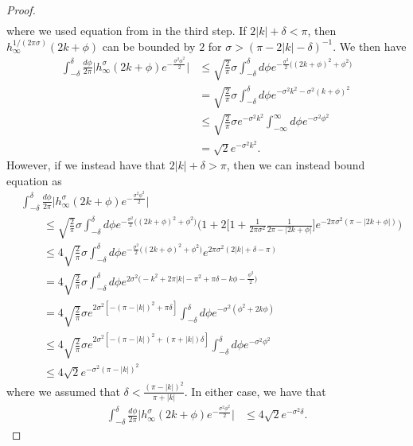 \documentclass[../thesis-main/thesis-main]{subfiles}
\begin{document}
\begin{proof}
\begin{align}
\end{align}
where we used equation  from  in the third step.  If $2|k|+ \delta < \pi$, then $h_{\infty}^{1/(2\pi\sigma)} (2k+\phi)$ can be bounded by $2$ for $\sigma > (\pi - 2|k| - \delta)^{-1}$.  We then have
\begin{align}
 \int_{-\delta}^\delta \frac{d\phi}{2\pi} \Big| h_\infty^\sigma(2 k+\phi) e^{-\frac{\sigma^2\phi^2}{2}}\Big|&\leq \sqrt{\frac{2}{\pi}} \sigma \int_{-\delta}^\delta d\phi e^{- \frac{\sigma^2}{2} \big( (2k + \phi)^2 + \phi^2\big)}\\
  & = \sqrt{\frac{2}{\pi}} \sigma \int_{-\delta}^{\delta} d\phi e^{ -\sigma^2 k^2 - \sigma^2 (k + \phi)^2}\\
  & \leq \sqrt{\frac{2}{\pi}} \sigma e^{-\sigma^2 k^2} \int_{-\infty}^\infty d\phi e^{ -\sigma^2 \phi^2}\\
  & = \sqrt{2} e^{-\sigma^2 k^2}.
\end{align}
However, if we instead have that  $2|k| + \delta > \pi$, then we can instead bound equation   as
\begin{align}
&\int_{-\delta}^\delta \frac{d\phi}{2\pi} \Big| h_\infty^\sigma(2 k+\phi) e^{-\frac{\sigma^2\phi^2}{2}}\Big|\nonumber\\
  & \qquad \leq \sqrt{\frac{2}{\pi}} \sigma \int_{-\delta}^{\delta}d\phi e^{ -\frac{\sigma^2}{2} \big( (2k+ \phi)^2 + \phi^2\big)}\Bigg( 1 + 2 \Bigg[ 1 + \frac{1}{2\pi \sigma^2} \frac{1}{ 2\pi - |2k + \phi|}\Bigg] e^{- 2\pi \sigma^2 (\pi - |2k + \phi|)}\Bigg)\\
  &\qquad \leq 4 \sqrt{\frac{2}{\pi}}\sigma \int_{-\delta}^{\delta} d\phi e^{ -\frac{\sigma^2}{2} \big( (2k+ \phi)^2 + \phi^2\big)} e^{2 \pi \sigma^2 (2 |k| + \delta - \pi)}\\
  &\qquad =4 \sqrt{\frac{2}{\pi}}\sigma \int_{-\delta}^{\delta} d\phi  e^{  2\sigma^2 \big(-k^2 +2\pi |k| -\pi^2 + \pi \delta - k\phi - \frac{\phi^2}{2} \big)}\\
  &\qquad =4 \sqrt{\frac{2}{\pi}}\sigma e^{2\sigma^2[-(\pi - |k|)^2 + \pi \delta]}\int_{-\delta}^{\delta} d\phi e^{  -\sigma^2 (\phi^2 + 2k\phi )}\\
  &\qquad \leq 4 \sqrt{\frac{2}{\pi}}\sigma e^{2\sigma^2[-(\pi - |k|)^2 + (\pi + |k|) \delta]} \int_{-\delta}^{\delta} d\phi e^{- \sigma^2 \phi^2}\\
  & \qquad \leq 4\sqrt{2} e^{ -\sigma^2 (\pi - |k|)^2}
  \end{align}
where we assumed that $\delta < \frac{(\pi-|k|)^2}{\pi + |k|}$.  In either case, we have that 
\begin{align}
\int_{-\delta}^\delta \frac{d\phi}{2\pi} \Big| h_\infty^\sigma(2 k+\phi) e^{-\frac{\sigma^2\phi^2}{2}}\Big|
  & \leq 4 \sqrt{2} e^{ - \sigma^2 \delta}\label{eq:gaussian_cross_term_bound}.
\end{align}


\end{proof}
\end{document}

